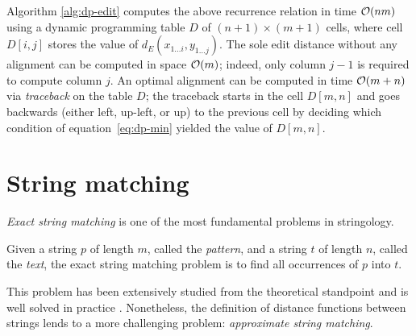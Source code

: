 Algorithm \ref{alg:dp-edit} computes the above recurrence relation in time $\mathcal{O}(nm)$ using a dynamic programming table $D$ of $(n+1) \times (m+1)$ cells, where cell $D[i,j]$ stores the value of $d_E(x_{1 \dots i},y_{1 \dots j})$.
The sole edit distance without any alignment can be computed in space $\mathcal{O}(m)$; indeed, only column $j-1$ is required to compute column $j$.
An optimal alignment can be computed in time $\mathcal{O}(m + n)$ via \emph{traceback} on the table $D$;
the traceback starts in the cell $D[m,n]$ and goes backwards (either left, up-left, or up) to the previous cell by deciding which condition of equation~\ref{eq:dp-min} yielded the value of $D[m,n]$.

%



\section{String matching}

\emph{Exact string matching} is one of the most fundamental problems in stringology.
\begin{definition}
\citep{Gusfield1997}
Given a string $p$ of length $m$, called the \emph{pattern}, and a string $t$ of length $n$, called the \emph{text}, the exact string matching problem is to find all occurrences of $p$ into $t$.
\end{definition}

This problem has been extensively studied from the theoretical standpoint and is well solved in practice \citep{Faro2013}.
Nonetheless, the definition of distance functions between strings lends to a more challenging problem: \emph{approximate string matching}.

